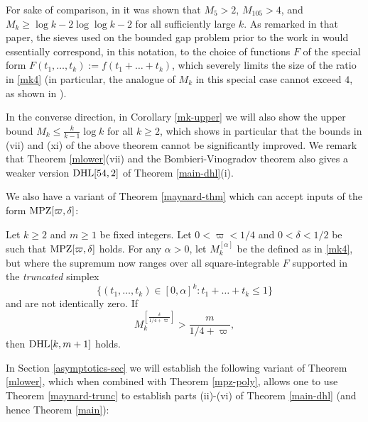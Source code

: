 For sake of comparison, in \cite[Proposition 4.3]{maynard-new} it was shown that $M_5 > 2$, $M_{105} > 4$, and $M_k \geq \log k - 2\log\log k - 2$ for all sufficiently large $k$.  As remarked in that paper, the sieves used on the bounded gap problem prior to the work in \cite{maynard-new} would essentially correspond, in this notation, to the choice of functions $F$ of the special form $F(t_1,\dots,t_k) := f(t_1+\dots+t_k)$, which severely limits the size of the ratio in
\eqref{mk4} (in particular, the analogue of $M_k$ in this special case cannot exceed $4$, as shown in \cite{sound}).

In the converse direction, in Corollary \ref{mk-upper} we will also show the upper bound $M_k \leq \frac{k}{k-1} \log k$ for all $k \geq 2$, which shows in particular that the bounds in (vii) and (xi) of the above theorem cannot be significantly improved.  We  remark that Theorem \ref{mlower}(vii) and the Bombieri-Vinogradov theorem also gives a weaker version $\operatorname*{DHL}[54,2]$ of Theorem \ref{main-dhl}(i).

We also have a variant of Theorem \ref{maynard-thm} which can accept inputs of the form $\operatorname*{MPZ}[\varpi,\delta]$:

\begin{theorem}\label{maynard-trunc}  Let $k \geq 2$ and $m \geq 1$ be fixed integers. Let $0<\varpi<1/4$ and $0 <\delta < 1/2$ be such that $\operatorname*{MPZ}[\varpi,\delta]$ holds.  For any $\alpha>0$, let $M_k^{[\alpha]}$ be the defined as in \eqref{mk4}, but where the supremum now ranges over all square-integrable $F$ supported in the \emph{truncated} simplex
\begin{equation}\label{ttk}
 \{ (t_1,\dots,t_k) \in [0,\alpha]^k: t_1+\dots+t_k \leq 1 \}
\end{equation}
and are not identically zero.  If
$$ M_k^{[\frac{\delta}{1/4+\varpi}]} > \frac{m}{1/4+\varpi},$$
then $\operatorname*{DHL}[k,m+1]$ holds.
\end{theorem}

In Section \ref{asymptotics-sec} we will establish the following variant of Theorem \ref{mlower}, which when combined with Theorem \ref{mpz-poly}, allows one to use Theorem \ref{maynard-trunc} to establish parts (ii)-(vi) of Theorem \ref{main-dhl} (and hence Theorem \ref{main}):

